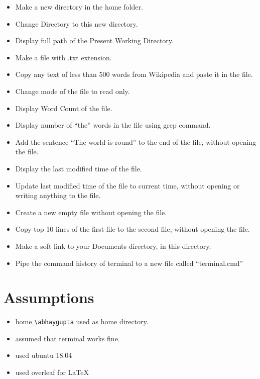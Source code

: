\documentclass[12pt,a4paper]{article}
\begin{document}
				\begin{itemize}


\item				     Make a new directory in the home folder.
\item Change Directory to this new directory.
\item    Display full path of the Present Working Directory.
 \item   Make a file with .txt extension.
\item    Copy any text of less than 500 words from Wikipedia and paste it in the file.
\item    Change mode of the file to read only.
\item    Display Word Count of the file.
\item    Display number of “the” words in the file using grep command.
\item    Add the sentence “The world is round” to the end of the file, without opening the file.
 \item   Display the last modified time of the file.
\item    Update last modified time of the file to current time, without opening or writing anything to the file.
\item    Create a new empty file without opening the file.
 \item   Copy top 10 lines of the first file to the second file, without opening the file.
 \item   Make a soft link to your Documents directory, in this directory.
  \item  Pipe the command history of terminal to a new file called “terminal.cmd”

								
				\end{itemize}
	\section{Assumptions}
		
			\begin{itemize}
		        \item home \verb+\abhaygupta+ used as home directory.
				\item assumed that terminal works fine.
				\item used ubuntu 18.04
				\item used overleaf for \LaTeX{}
			\end{itemize}
\end{document}
